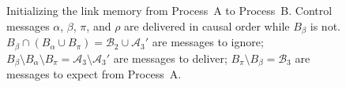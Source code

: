 

%     

\begin{figure}
  \begin{center}
    
    \caption{\label{fig:timelineproof}\label{fig:timeline}Initializing the link
      memory from Process~A to Process~B. Control messages $\alpha$, $\beta$,
      $\pi$, and $\rho$ are delivered in causal order while $B_\beta$ is not.
      $B_\beta \cap (B_\alpha \cup B_\pi) = \mathcal{B}_2 \cup \mathcal{A}_3'$
      are messages to ignore;
      $B_\beta \setminus B_\alpha \setminus B_\pi = \mathcal{A}_3\setminus
      \mathcal{A}_3'$
      are messages to deliver; $B_\pi \setminus B_\beta = \mathcal{B}_3$ are
      messages to expect from Process~A.}
  \end{center}
\end{figure}


